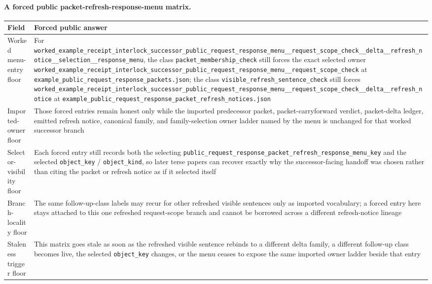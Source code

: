 \documentclass[11pt]{article}
\begin{document}
\paragraph{A forced public packet-refresh-response-menu matrix.}
\begin{table}[t]
\centering
\small
\begin{tabularx}{\linewidth}{@{}lX@{}}
\toprule
Field & Forced public answer \\
\midrule
Worked menu-entry floor & For \nolinkurl{worked_example_receipt_interlock_successor_public_request_response_menu__request_scope_check__delta__refresh_notice__selection__response_menu}, the class \nolinkurl{packet_membership_check} still forces the exact selected owner \nolinkurl{worked_example_receipt_interlock_successor_public_request_response_menu__request_scope_check} at \nolinkurl{example_public_request_response_packets.json}; the class \nolinkurl{visible_refresh_sentence_check} still forces \nolinkurl{worked_example_receipt_interlock_successor_public_request_response_menu__request_scope_check__delta__refresh_notice} at \nolinkurl{example_public_request_response_packet_refresh_notices.json} \\
Imported-owner floor & Those forced entries remain honest only while the imported predecessor packet, packet-carryforward verdict, packet-delta ledger, emitted refresh notice, canonical family, and family-selection owner ladder named by the menu is unchanged for that worked successor branch \\
Selector-visibility floor & Each forced entry still records both the selecting \nolinkurl{public_request_response_packet_refresh_response_menu_key} and the selected \nolinkurl{object_key} / \nolinkurl{object_kind}, so later terse papers can recover exactly why the successor-facing handoff was chosen rather than citing the packet or refresh notice as if it selected itself \\
Branch-locality floor & The same follow-up-class labels may recur for other refreshed visible sentences only as imported vocabulary; a forced entry here stays attached to this one refreshed request-scope branch and cannot be borrowed across a different refresh-notice lineage \\
Staleness trigger floor & This matrix goes stale as soon as the refreshed visible sentence rebinds to a different delta family, a different follow-up class becomes live, the selected \nolinkurl{object_key} changes, or the menu ceases to expose the same imported owner ladder beside that entry \\

\end{tabularx}
\end{table}
\end{document}
